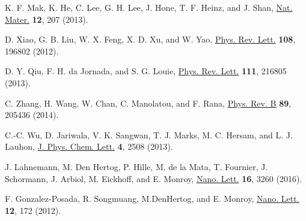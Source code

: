 \documentclass[%
 reprint,%
 amssymb, amsmath,%
 aip,cha,%
]{revtex4-1}
\begin{document}
\begin{thebibliography}{9}
K. F. Mak, K. He, C. Lee, G. H. Lee, J. Hone, T. F. Heinz, and J. Shan,
\href{https://www.nature.com/nmat/journal/v12/n3/full/nmat3505.html}{Nat. Mater.} \textbf{12}, 207 (2013).

D. Xiao, G. B. Liu, W. X. Feng, X. D. Xu, and W. Yao,
\href{https://journals.aps.org/prl/abstract/10.1103/PhysRevLett.108.196802}{Phys. Rev. Lett.} \textbf{108}, 196802 (2012).

D. Y. Qiu, F. H. da Jornada, and S. G. Louie,
\href{https://journals.aps.org/prl/abstract/10.1103/PhysRevLett.111.216805}{Phys. Rev. Lett.} \textbf{111}, 216805 (2013).

C. Zhang, H. Wang, W. Chan, C. Manolatou, and F. Rana,
\href{https://journals.aps.org/prb/abstract/10.1103/PhysRevB.89.205436}{Phys. Rev. B} \textbf{89}, 205436 (2014).

C.-C. Wu, D. Jariwala, V. K. Sangwan, T. J. Marks, M. C. Hersam, and L. J. Lauhon,
\href{http://pubs.acs.org/doi/abs/10.1021/jz401199x}{J. Phys. Chem. Lett.} \textbf{4}, 2508 (2013).

J. Lahnemann, M. Den Hertog, P. Hille, M. de la Mata, T. Fournier, J. Schormann, J. Arbiol, M. Eickhoff, and E. Monroy,
\href{http://pubs.acs.org/doi/abs/10.1021/acs.nanolett.6b00806}{Nano. Lett.} \textbf{16}, 3260 (2016).

F. Gonzalez-Posada, R. Songmuang, M.DenHertog, and E. Monroy,
\href{http://pubs.acs.org/doi/abs/10.1021/nl2032684}{Nano. Lett.} \textbf{12}, 172 (2012).

\end{thebibliography}
\end{document}

